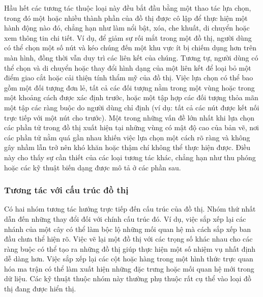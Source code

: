 \documentclass[12pt,a4paper, openany]{book}
\begin{document}
Hầu hết các tương tác thuộc loại này đều bắt đầu bằng một thao tác lựa chọn, trong đó một hoặc nhiều thành phần của đồ thị được cô lập để thực hiện một hành động nào đó, chẳng hạn như làm nổi bật, xóa, che khuất, di chuyển hoặc xem thông tin chi tiết. Ví dụ, để giảm sự rối mắt trong một đồ thị, người dùng có thể chọn một số nút và kéo chúng đến một khu vực ít bị chiếm dụng hơn trên màn hình, đồng thời vẫn duy trì các liên kết của chúng. Tương tự, người dùng có thể chọn và di chuyển hoặc thay đổi hình dạng của một liên kết để loại bỏ một điểm giao cắt hoặc cải thiện tính thẩm mỹ của đồ thị. Việc lựa chọn có thể bao gồm một đối tượng đơn lẻ, tất cả các đối tượng nằm trong một vùng hoặc trong một khoảng cách được xác định trước, hoặc một tập hợp các đối tượng thỏa mãn một tập các ràng buộc do người dùng chỉ định (ví dụ: tất cả các nút được kết nối trực tiếp với một nút cho trước). Một trong những vấn đề lớn nhất khi lựa chọn các phần tử trong đồ thị xuất hiện tại những vùng có mật độ cao của bản vẽ, nơi các phần tử nằm quá gần nhau khiến việc lựa chọn một cách rõ ràng và không gây nhầm lẫn trở nên khó khăn hoặc thậm chí không thể thực hiện được. Điều này cho thấy sự cần thiết của các loại tương tác khác, chẳng hạn như thu phóng hoặc các kỹ thuật biến dạng được mô tả ở các phần sau.

\subsubsection*{Tương tác với cấu trúc đồ thị}

Có hai nhóm tương tác hướng trực tiếp đến cấu trúc của đồ thị. Nhóm thứ nhất dẫn đến những thay đổi đối với chính cấu trúc đó. Ví dụ, việc sắp xếp lại các nhánh của một cây có thể làm bộc lộ những mối quan hệ mà cách sắp xếp ban đầu chưa thể hiện rõ. Việc vẽ lại một đồ thị với các trọng số khác nhau cho các ràng buộc có thể tạo ra những đồ thị giúp thực hiện một số nhiệm vụ nhất định dễ dàng hơn. Việc sắp xếp lại các cột hoặc hàng trong một hình thức trực quan hóa ma trận có thể làm xuất hiện những đặc trưng hoặc mối quan hệ mới trong dữ liệu. Các kỹ thuật thuộc nhóm này thường phụ thuộc rất cụ thể vào loại đồ thị đang được hiển thị.
\end{document}
